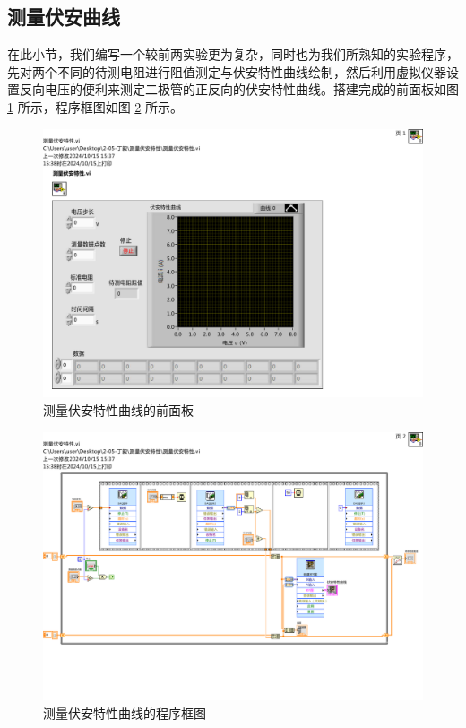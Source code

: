 \documentclass[UTF8]{article}
\theoremstyle{MyLineTheoremStyle} %
\theoremstyle{MyBlockTheoremStyle} %
\theoremstyle{MySubsubsectionStyle} %
\begin{document}
\subsection{测量伏安曲线}
在此小节，我们编写一个较前两实验更为复杂，同时也为我们所熟知的实验程序，先对两个不同的待测电阻进行阻值测定与伏安特性曲线绘制，然后利用虚拟仪器设置反向电压的便利来测定二极管的正反向的伏安特性曲线。搭建完成的前面板如图 \ref{测量伏安特性曲线的前面板} 所示，程序框图如图 \ref{测量伏安特性曲线的程序框图} 所示。


\begin{figure}[H]\centering
\includegraphics[width=0.7\columnwidth]{assets/测量伏安曲线__面板.pdf}
\caption{测量伏安特性曲线的前面板}\label{测量伏安特性曲线的前面板}
\end{figure}
\begin{figure}[H]\centering
\includegraphics[width=\columnwidth]{assets/测量伏安曲线__框图.pdf}
\caption{测量伏安特性曲线的程序框图}\label{测量伏安特性曲线的程序框图}
\end{figure}
\end{document}
